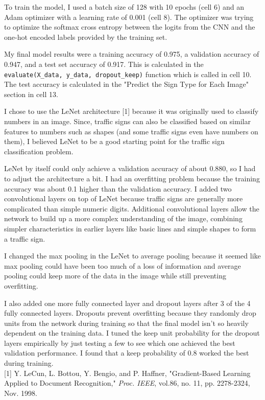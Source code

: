 \documentclass[12pt]{article}
\begin{document}
To train the model, I used a batch size of 128 with 10 epochs (cell 6) and an Adam optimizer with a learning rate of 0.001 (cell 8). The optimizer was trying to optimize the softmax cross entropy between the logits from the CNN and the one-hot encoded labels provided by the training set.

My final model results were a training accuracy of 0.975, a validation accuracy of 0.947, and a test set accuracy of 0.917. This is calculated in the \verb|evaluate(X_data, y_data, dropout_keep)| function which is called in cell 10. The test accuracy is calculated in the "Predict the Sign Type for Each Image" section in cell 13.

I chose to use the LeNet architecture [1] because it was originally used to classify numbers in an image. Since, traffic signs can also be classified based on similar features to numbers such as shapes (and some traffic signs even have numbers on them), I believed LeNet to be a good starting point for the traffic sign classification problem.

LeNet by itself could only achieve a validation accuracy of about 0.880, so I had to adjust the architecture a bit. I had an overfitting problem because the training accuracy was about 0.1 higher than the validation accuracy. I added two convolutional layers on top of LeNet because traffic signs are generally more complicated than simple numeric digits. Additional convolutional layers allow the network to build up a more complex understanding of the image, combining simpler characteristics in earlier layers like basic lines and simple shapes to form a traffic sign. 

I changed the max pooling in the LeNet to average pooling because it seemed like max pooling could have been too much of a loss of information and average pooling could keep more of the data in the image while still preventing overfitting.

I also added one more fully connected layer and dropout layers after 3 of the 4 fully connected layers. Dropouts prevent overfitting because they randomly drop units from the network during training so that the final model isn't so heavily dependent on the training data. I tuned the keep unit probability for the dropout layers empirically by just testing a few to see which one achieved the best validation performance. I found that a keep probability of 0.8 worked the best during training.
\\

[1] Y. LeCun, L. Bottou, Y. Bengio, and P. Haffner, "Gradient-Based Learning Applied to Document Recognition," \textit{Proc. IEEE}, vol.86, no. 11, pp. 2278-2324, Nov. 1998.
\end{document}
